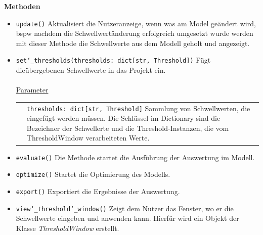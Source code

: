 \documentclass{article}
\begin{document}
\textbf{{Methoden}}
\begin{itemize}
\item \texttt{update()} \newline Aktualisiert die Nutzeranzeige, wenn was am Model geändert wird, bspw nachdem die Schwellwertänderung erfolgreich umgesetzt wurde werden mit dieser Methode die Schwellwerte aus dem Modell geholt und angezeigt.

\item \texttt{set\char`_thresholds(thresholds: dict[str, Threshold])} \newline Fügt dieübergebenen Schwellwerte in das Projekt ein.
\\\\
\underline{{Parameter}}\\ 
\begin{tabular}{lp{10.7cm}}
 & \texttt{thresholds: dict[str, Threshold]} Sammlung von Schwellwerten, die eingefügt werden müssen. Die Schlüssel im Dictionary sind die Bezeichner der Schwellerte und die Threshold-Instanzen, die vom ThresholdWindow verarbeiteten Werte.\\
\end{tabular}

\item \texttt{evaluate()} \newline Die Methode startet die Ausführung der Auswertung im Modell.

\item \texttt{optimize()} \newline Startet die Optimierung des Modells.

\item \texttt{export()} \newline Exportiert die Ergebnisse der Auswertung. 

\item \texttt{view\char`_threshold\char`_window()} \newline Zeigt dem Nutzer das Fenster, wo er die Schwellwerte eingeben und anwenden kann. Hierfür wird ein Objekt der Klasse \textit{ThresholdWindow} erstellt.
\end{itemize}
\end{document}
